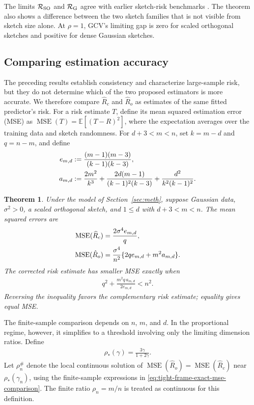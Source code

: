 \documentclass{article}
\theoremstyle{plain}
\newtheorem{theorem}{Theorem}[section]
\theoremstyle{definition}
\theoremstyle{definition}
\def\E{{\mathbb{E}}}
\def\cal{\mathcal}
\def\calR{{\cal R}}\def\scrR{{\mathscr R}}\def\Rhat{\widehat{R}}\def\Rtil{{\widetilde R}}\def\Rbar{{\overline R}}
\newcommand{\hR}{\hat{R}}
\begin{document}
The limits $\calR_{\rm SO}$ and $\calR_{\rm G}$ agree with earlier sketch-risk benchmarks \citep{dobriban2019asymptotics,chen2023sketched}. The theorem also shows a difference between the two sketch families that is not visible from sketch size alone. At $\rho=1$, GCV's limiting gap is zero for scaled orthogonal sketches and positive for dense Gaussian sketches.

\subsection{Comparing estimation accuracy}

The preceding results establish consistency and characterize large-sample risk, but they do not determine which of the two proposed estimators is more accurate. We therefore compare $\widehat R_c$ and $\hR_o$ as estimates of the same fitted predictor's risk. For a risk estimate $T$, define its mean squared estimation error (MSE) as $\operatorname{MSE}(T)=\E[(T-R)^2]$, where the expectation averages over the training data and sketch randomness. For $d+3<m<n$, set $k=m-d$ and $q=n-m$, and define
\begin{align*}
   e_{m,d}&:=\frac{(m-1)(m-3)}{(k-1)(k-3)}, \notag\\
   a_{m,d}&:=\frac{2m^2}{k^3}
     +\frac{2d(m-1)}{(k-1)^2(k-3)}
     +\frac{d^2}{k^2(k-1)^2}.
\end{align*}

\begin{theorem}
\label{thm:tight-frame-mse-comparison}
Under the model of Section~\ref{sec:meth}, suppose Gaussian data,
$\sigma^2>0$, a scaled orthogonal sketch, and $1\leq d$ with $d+3<m<n$.
The mean squared errors are
\begin{align}
   \operatorname{MSE}(\widehat R_c)
   &=\frac{2\sigma^4e_{m,d}}q, \notag\\
   \operatorname{MSE}(\hR_o)&=
   \frac{\sigma^4}{n^2}\{2qe_{m,d}+m^2a_{m,d}\}.
   \label{eq:tight-frame-exact-mse-comparison}
\end{align}
The corrected risk estimate has smaller MSE exactly when
\begin{align}
   q^2+\frac{m^2q\,a_{m,d}}{2e_{m,d}}<n^2.
   \label{eq:tight-frame-finite-mse-rule}
\end{align}
Reversing the inequality favors the complementary risk estimate; equality
gives equal MSE.
\end{theorem}

The finite-sample comparison depends on $n$, $m$, and $d$. In the proportional regime, however, it simplifies to a threshold involving only the limiting dimension ratios. Define
\begin{align*}
 \rho_*(\gamma)=\frac{3\gamma}{1+2\gamma}.
\end{align*}
Let $\rho_n^{\#}$ denote the local continuous solution of
$\operatorname{MSE}(\hR_o)=\operatorname{MSE}(\widehat R_c)$ near
$\rho_*(\gamma_n)$, using the finite-sample expressions in
\eqref{eq:tight-frame-exact-mse-comparison}.
The finite ratio $\rho_n=m/n$ is treated as continuous for this definition.
\end{document}
